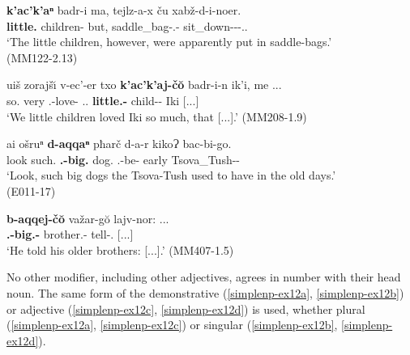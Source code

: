 \begin{exe}
	\ex\label{simplenp-ex11}
	\begin{xlist}
		
		\ex\label{simplenp-ex11a}
		\gll \textbf{k'ac'k'aⁿ} badr-i ma, tejlz-a-x ču xabž-d-i-noer. \\
		\textbf{little.{\Pl}} children-{\Pl} but, saddle\_bag-{\Obl}.{\Pl}-{\Cont} {\Pv} sit\_down-{\D}-{\Tr}-{\Nw}.{\Rem}.{\Seq} \\
		\trans `The little children, however, were apparently put in saddle-bags.' \\
		\hfill (MM122-2.13)
		
		\ex\label{simplenp-ex11b}
		\gll uiš zorajš\u{\i} v-ec'-er txo\textsuperscript{} \textbf{k'ac'k'aj-č\u{o}} badr-i-n ik'i, me ... \\
		so.{\Dist} very {\M}.{\Sg}-love-{{\Imprf}} {\Fpl}.{\Excl}.{\Dat} \textbf{little.{\Pl}-{\Obl}} child-{\Pl}-{\Dat} Iki {\Subord} [...] \\
		\trans `We little children loved Iki so much, that [...].'
		\hfill (MM208-1.9)
		
		\ex\label{simplenp-ex11c}
		\gll ai ošruⁿ \textbf{d-aqqaⁿ} pħarč d-a-r kikoɁ bac-bi-go. \\
		look such.{\Dist} \textbf{{\B}.{\Pl}-big.{\Pl}} dog.{\Pl} {\B}.{\Pl}-be-{{\Imprf}} early Tsova\_Tush-{\Pl}-{\Adess} \\
		\trans `Look, such big dogs the Tsova-Tush used to have in the old days.' \\
		\hfill (E011-17)
		
		\ex\label{simplenp-ex11d}
		\gll \textbf{b-aqqej-č\u{o}} važar-g\u{o} lajv-nor: ... \\
		\textbf{{\M}.{\Pl}-big.{\Pl}-{\Obl}} brother.{\Pl}-{\All} tell-{\Nw}.{\Rem} [...] \\
		\trans `He told his older brothers: [...].'
		\hfill (MM407-1.5)
		
	\end{xlist}
\end{exe}

No other modifier, including other adjectives, agrees in number with their head noun. The same form of the demonstrative (\ref{simplenp-ex12a}, \ref{simplenp-ex12b}) or adjective (\ref{simplenp-ex12c}, \ref{simplenp-ex12d}) is used, whether plural (\ref{simplenp-ex12a}, \ref{simplenp-ex12c}) or singular (\ref{simplenp-ex12b}, \ref{simplenp-ex12d}).

